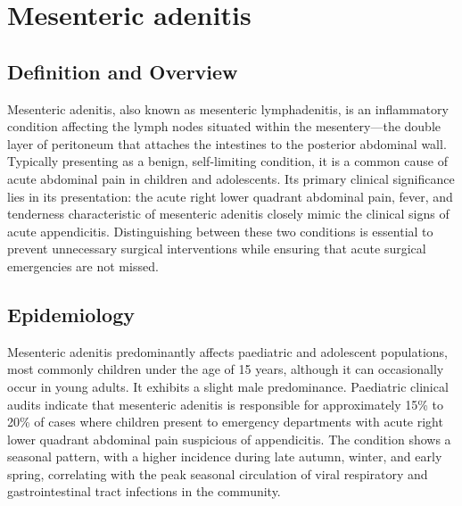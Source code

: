 \chapter{Mesenteric adenitis}

\section*{Definition and Overview}
Mesenteric adenitis, also known as mesenteric lymphadenitis, is an inflammatory condition affecting the lymph nodes situated within the mesentery—the double layer of peritoneum that attaches the intestines to the posterior abdominal wall. Typically presenting as a benign, self-limiting condition, it is a common cause of acute abdominal pain in children and adolescents. Its primary clinical significance lies in its presentation: the acute right lower quadrant abdominal pain, fever, and tenderness characteristic of mesenteric adenitis closely mimic the clinical signs of acute appendicitis. Distinguishing between these two conditions is essential to prevent unnecessary surgical interventions while ensuring that acute surgical emergencies are not missed.

\section*{Epidemiology}
Mesenteric adenitis predominantly affects paediatric and adolescent populations, most commonly children under the age of 15 years, although it can occasionally occur in young adults. It exhibits a slight male predominance. Paediatric clinical audits indicate that mesenteric adenitis is responsible for approximately 15\% to 20\% of cases where children present to emergency departments with acute right lower quadrant abdominal pain suspicious of appendicitis. The condition shows a seasonal pattern, with a higher incidence during late autumn, winter, and early spring, correlating with the peak seasonal circulation of viral respiratory and gastrointestinal tract infections in the community.

